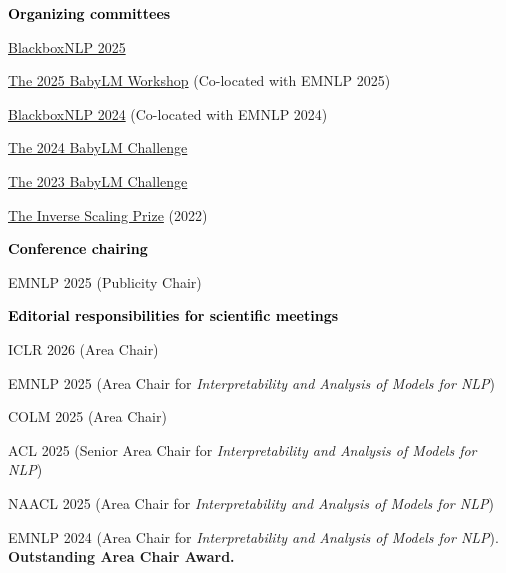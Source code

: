 \documentclass[10pt]{article}
\renewcommand{\subsection}[1]{\textcolor{black}{#1}}
\newcommand{\halfblankline}{\quad\vspace{-0.5\baselineskip}\pagebreak[3]}
\providecommand*\titlelink[2]{\href{#1}{\textcolor{accent}{#2}}}
\begin{document}
	\subsection{\textbf{Organizing committees}}
	\begin{innerlist}[itemsep=0pt]
	\item \titlelink{https://blackboxnlp.github.io}{BlackboxNLP 2025}
	\item \titlelink{https://babylm.github.io}{The 2025 BabyLM Workshop} (Co-located with EMNLP 2025)
	\item \titlelink{https://blackboxnlp.github.io}{BlackboxNLP 2024} (Co-located with EMNLP 2024)
	\item \titlelink{https://babylm.github.io}{The 2024 BabyLM Challenge}
	\item \titlelink{https://babylm.github.io/archive_2023.html}{The 2023 BabyLM Challenge}
	\item \titlelink{https://github.com/inverse-scaling/prize}{The Inverse Scaling Prize} (2022)
	\end{innerlist}

	\halfblankline

	\subsection{\textbf{Conference chairing}}
	\begin{innerlist}[itemsep=0pt]
	\item EMNLP 2025 (Publicity Chair)
	\end{innerlist}

	\halfblankline

	\subsection{\textbf{Editorial responsibilities for scientific meetings}}
	\begin{innerlist}[itemsep=0pt]
	\item ICLR 2026 (Area Chair)
	\item EMNLP 2025 (Area Chair for \emph{Interpretability and Analysis of Models for NLP})
	\item COLM 2025 (Area Chair)
	\item ACL 2025 (Senior Area Chair for \emph{Interpretability and Analysis of Models for NLP})
	\item NAACL 2025 (Area Chair for \emph{Interpretability and Analysis of Models for NLP})
	\item EMNLP 2024 (Area Chair for \emph{Interpretability and Analysis of Models for NLP}). \textbf{\textcolor{accent}{Outstanding Area Chair Award.}}
	\end{innerlist}
\end{document}
